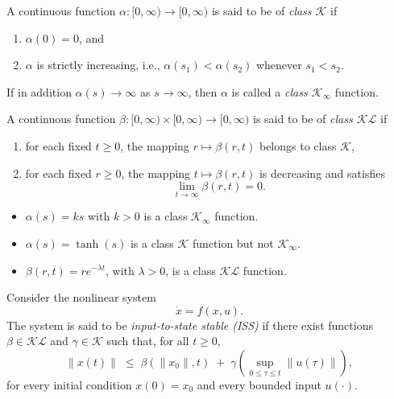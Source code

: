 \begin{definition}
A continuous function $\alpha:[0,\infty)\to[0,\infty)$ is said to be of 
\emph{class $\mathcal{K}$} if
\begin{enumerate}
    \item $\alpha(0)=0$, and
    \item $\alpha$ is strictly increasing, i.e., $\alpha(s_1)<\alpha(s_2)$ whenever $s_1<s_2$.
\end{enumerate}
If in addition $\alpha(s)\to\infty$ as $s\to\infty$, then $\alpha$ is called a 
\emph{class $\mathcal{K}_\infty$} function.
\end{definition}

\begin{definition}
A continuous function $\beta:[0,\infty)\times [0,\infty)\to[0,\infty)$ is said to be of
\emph{class $\mathcal{KL}$} if
\begin{enumerate}
    \item for each fixed $t\ge 0$, the mapping $r\mapsto \beta(r,t)$ belongs to class $\mathcal{K}$,
    \item for each fixed $r\ge 0$, the mapping $t\mapsto \beta(r,t)$ is decreasing and satisfies
    \[
    \lim_{t\to\infty}\beta(r,t)=0.
    \]
\end{enumerate}
\end{definition}

\begin{example}
\begin{itemize}
    \item $\alpha(s) = ks$ with $k>0$ is a class $\mathcal{K}_\infty$ function.
    \item $\alpha(s) = \tanh(s)$ is a class $\mathcal{K}$ function but not $\mathcal{K}_\infty$.
    \item $\beta(r,t) = r e^{-\lambda t}$, with $\lambda>0$, is a class $\mathcal{KL}$ function.
\end{itemize}
\end{example}

\begin{definition}
Consider the nonlinear system
\begin{equation}
    \dot{x} = f(x,u).
\end{equation}
The system is said to be \emph{input-to-state stable (ISS)} if there exist functions 
$\beta \in \mathcal{KL}$ and $\gamma \in \mathcal{K}$ such that, for all $t \geq 0$,
\begin{equation}
    \|x(t)\| \;\leq\; \beta(\|x_0\|,t) \;+\; \gamma\!\left(\sup_{0\le \tau \le t}\|u(\tau)\|\right),
\end{equation}
for every initial condition $x(0)=x_0$ and every bounded input $u(\cdot)$.  
\end{definition}

